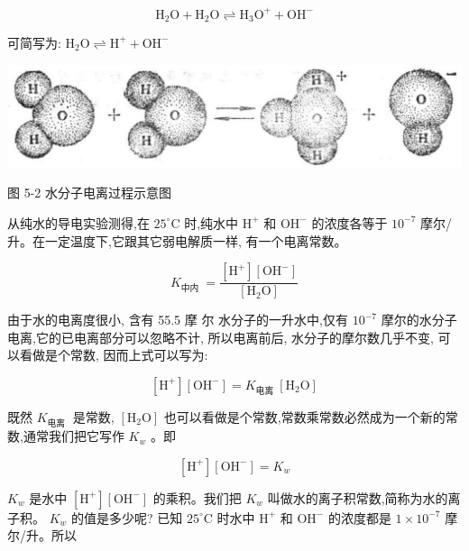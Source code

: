 \documentclass[10pt]{article}
\begin{document}
\[
{\mathrm{H}}_{2}\mathrm{O} + {\mathrm{H}}_{2}\mathrm{O} \rightleftharpoons {\mathrm{H}}_{3}{\mathrm{O}}^{ + } + {\mathrm{{OH}}}^{ - }
\]

可简写为: \({\mathrm{H}}_{2}\mathrm{O} \rightleftharpoons {\mathrm{H}}^{ + } + {\mathrm{{OH}}}^{ - }\)

\begin{center}
\includegraphics[max width=1.0\textwidth]{images/01912d13-9986-7822-a012-3f3f7be99dcb_137_937048.jpg}
\end{center}

图 5-2 水分子电离过程示意图

从纯水的导电实验测得,在 \({25}^{ \circ }\mathrm{C}\) 时,纯水中 \({\mathrm{H}}^{ + }\) 和 \({\mathrm{{OH}}}^{ - }\) 的浓度各等于 \({10}^{-7}\) 摩尔/ 升。在一定温度下,它跟其它弱电解质一样, 有一个电离常数。

\[
{K}_{\text{中内 }} = \frac{\left\lbrack {\mathrm{H}}^{ + }\right\rbrack \left\lbrack {\mathrm{{OH}}}^{ - }\right\rbrack }{\left\lbrack {\mathrm{H}}_{2}\mathrm{O}\right\rbrack }
\]

由于水的电离度很小, 含有 55.5 摩 尔 水分子的一升水中,仅有 \({10}^{-7}\) 摩尔的水分子电离,它的已电离部分可以忽略不计, 所以电离前后, 水分子的摩尔数几乎不变, 可以看做是个常数, 因而上式可以写为:

\[
\left\lbrack {\mathrm{H}}^{ + }\right\rbrack \left\lbrack {\mathrm{{OH}}}^{ - }\right\rbrack = {K}_{\text{电离 }}\left\lbrack {{\mathrm{H}}_{2}\mathrm{O}}\right\rbrack
\]

既然 \({K}_{\text{电离 }}\) 是常数, \(\left\lbrack {{\mathrm{H}}_{2}\mathrm{O}}\right\rbrack\) 也可以看做是个常数,常数乘常数必然成为一个新的常数,通常我们把它写作 \({K}_{w}\) 。即

\[
\left\lbrack {\mathrm{H}}^{ + }\right\rbrack \left\lbrack {\mathrm{{OH}}}^{ - }\right\rbrack = {K}_{w}
\]

\({K}_{w}\) 是水中 \(\left\lbrack {\mathrm{H}}^{ + }\right\rbrack \left\lbrack {\mathrm{{OH}}}^{ - }\right\rbrack\) 的乘积。我们把 \({K}_{w}\) 叫做水的离子积常数,简称为水的离子积。 \({K}_{w}\) 的值是多少呢? 已知 \({25}^{ \circ }\mathrm{C}\) 时水中 \({\mathrm{H}}^{ + }\) 和 \({\mathrm{{OH}}}^{ - }\) 的浓度都是 \(1 \times {10}^{-7}\) 摩尔/升。所以
\end{document}
